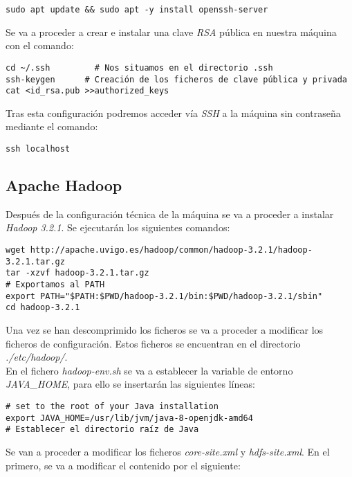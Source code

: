 \documentclass[11pt,a4paper]{article}
\begin{document}
\begin{lstlisting}
sudo apt update && sudo apt -y install openssh-server
\end{lstlisting}

Se va a proceder a crear e instalar una clave \emph{RSA} pública en nuestra máquina con el comando:

\begin{lstlisting}
cd ~/.ssh		  # Nos situamos en el directorio .ssh
ssh-keygen		# Creación de los ficheros de clave pública y privada
cat <id_rsa.pub >>authorized_keys
\end{lstlisting}

Tras esta configuración podremos acceder vía \emph{SSH} a la máquina sin contraseña mediante el comando:

\begin{lstlisting}
ssh localhost
\end{lstlisting}

\subsection{Apache Hadoop}

Después de la configuración técnica de la máquina se va a proceder a instalar \emph{Hadoop 3.2.1}. Se ejecutarán los siguientes comandos:

\begin{lstlisting}
wget http://apache.uvigo.es/hadoop/common/hadoop-3.2.1/hadoop-3.2.1.tar.gz
tar -xzvf hadoop-3.2.1.tar.gz
# Exportamos al PATH
export PATH="$PATH:$PWD/hadoop-3.2.1/bin:$PWD/hadoop-3.2.1/sbin" 
cd hadoop-3.2.1
\end{lstlisting}

Una vez se han descomprimido los ficheros se va a proceder a modificar los ficheros de configuración. Estos ficheros se encuentran en el directorio \emph{./etc/hadoop/}.\\
En el fichero \emph{hadoop-env.sh} se va a establecer la variable de entorno \emph{JAVA\_{}HOME}, para ello se insertarán las siguientes líneas:

\begin{lstlisting}
# set to the root of your Java installation
export JAVA_HOME=/usr/lib/jvm/java-8-openjdk-amd64
# Establecer el directorio raíz de Java
\end{lstlisting}

Se van a proceder a modificar los ficheros \emph{core-site.xml} y \emph{hdfs-site.xml}. En el primero, se va a modificar el contenido por el siguiente:
\end{document}
